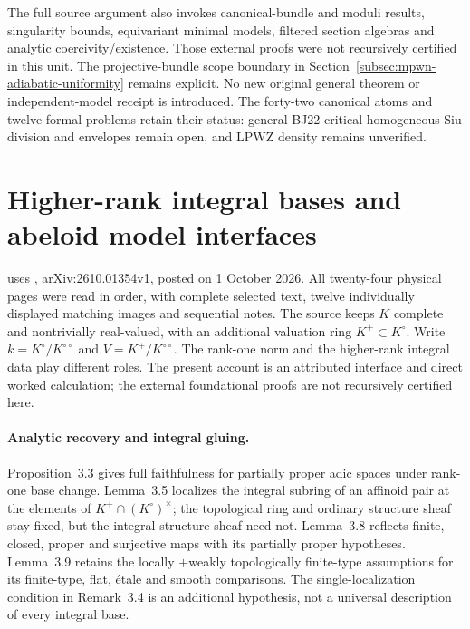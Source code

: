 The full source argument also invokes canonical-bundle and
moduli results, singularity bounds, equivariant minimal models,
filtered section algebras and analytic coercivity/existence.
Those external proofs were not recursively certified in this
unit. The projective-bundle scope boundary in
Section~\ref{subsec:mpwn-adiabatic-uniformity} remains explicit.
No new original general theorem or independent-model receipt
is introduced. The forty-two canonical atoms and twelve formal
problems retain their status: general BJ22 critical homogeneous
Siu division and envelopes remain open, and LPWZ density remains
unverified.

\section{Higher-rank integral bases and abeloid model interfaces}
\label{sec:appL-higher-rank-abeloid-boundary}

 uses
\cite{KaibWerner26HigherRankV1}, arXiv:2610.01354v1, posted on
1 October 2026. All twenty-four physical pages were read in order,
with complete selected text, twelve individually displayed matching
images and sequential notes. The source keeps $K$ complete and
nontrivially real-valued, with an additional valuation ring
$K^+\subset K^\circ$. Write $k=K^\circ/K^{\circ\circ}$ and
$V=K^+/K^{\circ\circ}$. The rank-one norm and the higher-rank
integral data play different roles. The present account is an attributed
interface and direct worked calculation; the external foundational
proofs are not recursively certified here.

\paragraph{Analytic recovery and integral gluing.}
Proposition~3.3 gives full faithfulness for partially proper adic spaces
under rank-one base change. Lemma~3.5 localizes the integral
subring of an affinoid pair at the elements of $K^+\cap(K^\circ)^\times$;
the topological ring and ordinary structure sheaf stay fixed, but the
integral structure sheaf need not. Lemma~3.8 reflects finite,
closed, proper and surjective maps with its partially proper hypotheses.
Lemma~3.9 retains the locally $+$weakly topologically finite-type assumptions
for its finite-type, flat, \'etale and smooth comparisons.
The single-localization condition in Remark~3.4 is an additional
hypothesis, not a universal description of every integral base.

